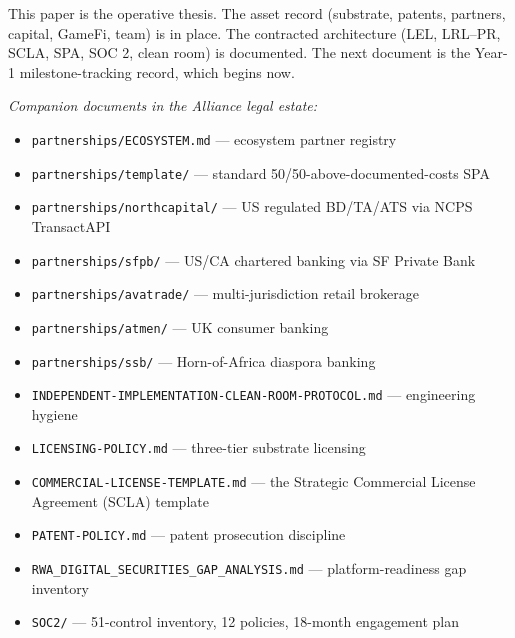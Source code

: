 This paper is the operative thesis. The asset record (substrate,
patents, partners, capital, GameFi, team) is in place. The contracted
architecture (LEL, LRL--PR, SCLA, SPA, SOC 2, clean room) is
documented. The next document is the Year-1 milestone-tracking
record, which begins now.

\vspace{2em}
\noindent\hrulefill

\vspace{1em}
\noindent\textit{Companion documents in the Alliance legal estate:}

\begin{itemize}[leftmargin=2em,itemsep=0.05em]
\item \texttt{partnerships/ECOSYSTEM.md} --- ecosystem partner registry
\item \texttt{partnerships/template/} --- standard 50/50-above-documented-costs SPA
\item \texttt{partnerships/northcapital/} --- US regulated BD/TA/ATS via NCPS TransactAPI
\item \texttt{partnerships/sfpb/} --- US/CA chartered banking via SF Private Bank
\item \texttt{partnerships/avatrade/} --- multi-jurisdiction retail brokerage
\item \texttt{partnerships/atmen/} --- UK consumer banking
\item \texttt{partnerships/ssb/} --- Horn-of-Africa diaspora banking
\item \texttt{INDEPENDENT-IMPLEMENTATION-CLEAN-ROOM-PROTOCOL.md} --- engineering hygiene
\item \texttt{LICENSING-POLICY.md} --- three-tier substrate licensing
\item \texttt{COMMERCIAL-LICENSE-TEMPLATE.md} --- the Strategic Commercial License Agreement (SCLA) template
\item \texttt{PATENT-POLICY.md} --- patent prosecution discipline
\item \texttt{RWA\_DIGITAL\_SECURITIES\_GAP\_ANALYSIS.md} --- platform-readiness gap inventory
\item \texttt{SOC2/} --- 51-control inventory, 12 policies, 18-month engagement plan
\end{itemize}

